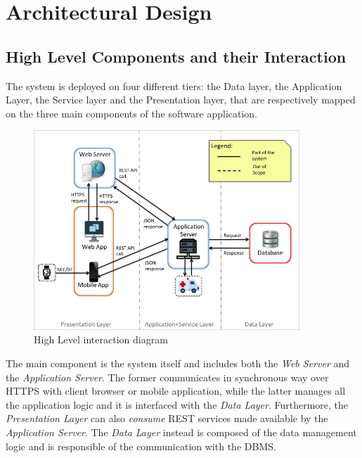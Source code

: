 \documentclass[a4paper]{article}
\begin{document}
\newpage
\section{Architectural Design}
\subsection{High Level Components and their Interaction}
The system is deployed on four different tiers: the Data layer, the Application Layer, the Service layer and the Presentation layer, that are respectively mapped on the three main components of the software application.
\begin{figure}[!htpb]
    	\centering
    	\includegraphics[width=100mm,keepaspectratio]{images/highlevel.jpg}
    	\caption{High Level interaction diagram}
\end{figure}

The main component is the system itself and includes both the \textit{Web Server} and the \textit{Application Server}. The former communicates in synchronous way over HTTPS with client browser or mobile application, while the latter manages all the application logic and it is interfaced with the \textit{Data Layer}. Furthermore, the \textit{Presentation Layer} can also \textit{consume} REST services made available by the \textit{Application Server}. The \textit{Data Layer} instead is composed of the data management logic and is responsible of the communication with the DBMS.
\end{document}
